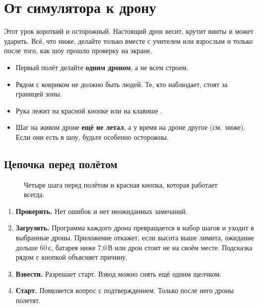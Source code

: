 \chapter{От симулятора к дрону}\label{ch:k-dronu}

Этот урок короткий и осторожный. Настоящий дрон весит, крутит винты и может ударить. Всё, что ниже, делайте только вместе с учителем или взрослым и только после того, как шоу прошло проверку на экране.

\begin{opasno}
\begin{itemize}
  \item Первый полёт делайте \textbf{одним дроном}, а не всем строем.
  \item Рядом с ковриком не должно быть людей. Те, кто наблюдает, стоят за границей зоны.
  \item Рука лежит на красной кнопке  или на клавише .
  \item Шаг  на живом дроне \textbf{ещё не летал}, а у  время на дроне другое (см.\ ниже). Если они есть в шоу, будьте особенно осторожны.
\end{itemize}
\end{opasno}

\section{Цепочка перед полётом}

\begin{figure}[H]
  \centering
  
  \caption{Четыре шага перед полётом и красная кнопка, которая работает всегда.}\label{fig:chain}
\end{figure}

\begin{enumerate}
  \item \textbf{Проверить.} Нет ошибок и нет неожиданных замечаний.
  \item \textbf{Загрузить.} Программа каждого дрона превращается в набор шагов и уходит в выбранные дроны. Приложение откажет, если высота выше лимита, ожидание дольше 60\,с, батарея ниже 7,0\,В или дрон стоит не на своём месте. Подсказка рядом с кнопкой объясняет причину.
  \item \textbf{Взвести.} Разрешает старт. Взвод можно снять ещё одним щелчком.
  \item \textbf{Старт.} Появляется вопрос с подтверждением. Только после него дроны полетят.
\end{enumerate}

